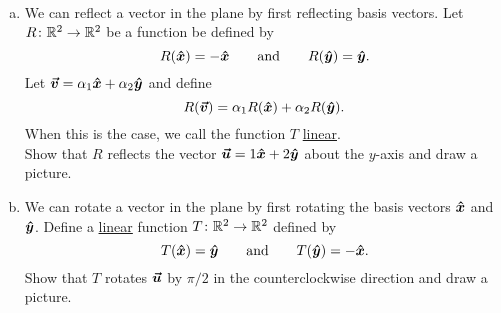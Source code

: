 \documentclass[12pt]{article} %
\begin{document}
\newpage
\begin{problem}~
\begin{enumerate}[(a)]
    \item We can reflect a vector in the plane by first reflecting basis vectors. Let $R\colon \mathbb{R}^2 \to \mathbb{R}^2$ be a function be defined by 
    \[
    R(\boldsymbol{\hat{x}}) = -\boldsymbol{\hat{x}} \qquad \textrm{and} \qquad R(\boldsymbol{\hat{y}})=\boldsymbol{\hat{y}}.
    \]
    Let $\boldsymbol{\vec{v}} = \alpha_1 \boldsymbol{\hat{x}} + \alpha_2 \boldsymbol{\hat{y}}$ and define
    \[
    R(\boldsymbol{\vec{v}}) = \alpha_1 R(\boldsymbol{\hat{x}}) + \alpha_2 R(\boldsymbol{\hat{y}}).
    \]
    When this is the case, we call the function $T$ \underline{linear}.\\
    \noindent Show that $R$ reflects the vector $\boldsymbol{\vec{u}} = 1\boldsymbol{\hat{x}} + 2\boldsymbol{\hat{y}}$ about the $y$-axis and draw a picture.
    \item We can rotate a vector in the plane by first rotating the basis vectors $\boldsymbol{\hat{x}}$ and $\boldsymbol{\hat{y}}$. Define a \underline{linear} function $T\colon \mathbb{R}^2 \to \mathbb{R}^2$ defined by
    \[
    T(\boldsymbol{\hat{x}})=\boldsymbol{\hat{y}} \qquad \textrm{and} \qquad T(\boldsymbol{\hat{y}})=-\boldsymbol{\hat{x}}.
    \]
    \noindent Show that $T$ rotates $\boldsymbol{\vec{u}}$ by $\pi/2$ in the counterclockwise direction and draw a picture.
\end{enumerate}
\end{problem}
\end{document}
